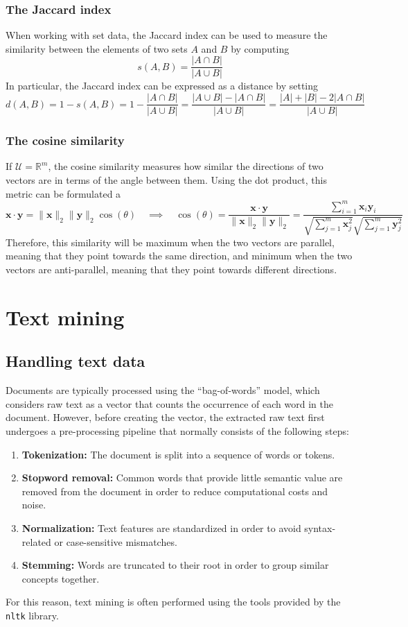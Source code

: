 \documentclass{report}
\begin{document}
\subsection{The Jaccard index}
When working with set data, the Jaccard index can be used to measure the similarity between the elements of two sets $\displaystyle A$ and $\displaystyle B$ by computing
\[s(A, B) = \frac{|A \cap B|}{|A \cup B|}\]
In particular, the Jaccard index can be expressed as a distance by setting
\[d(A, B) = 1 - s(A, B) = 1 - \frac{|A \cap B|}{|A \cup B|} = \frac{|A \cup B| - |A \cap B|}{|A \cup B|} = \frac{|A| + |B| - 2|A \cap B|}{|A \cup B|}\]
\subsection{The cosine similarity}
If $\displaystyle \mathcal{U} = \mathbb{R}^m$, the cosine similarity measures how similar the directions of two vectors are in terms of the angle between them. \newline
Using the dot product, this metric can be formulated a
\[\mathbf{x} \cdot \mathbf{y} = \lVert \mathbf{x} \rVert_2 \lVert \mathbf{y} \rVert_2 \cos(\theta) 
\quad \implies \quad 
\cos(\theta) = \frac{\mathbf{x} \cdot \mathbf{y}}{\lVert \mathbf{x} \rVert_2 \lVert \mathbf{y} \rVert_2} = \frac{\sum_{i = 1}^m \mathbf{x}_i\mathbf{y}_i}{\sqrt{\sum_{j = 1}^m \mathbf{x}_j^2}\sqrt{\sum_{j = 1}^m \mathbf{y}_j^2}}\]
Therefore, this similarity will be maximum when the two vectors are parallel, meaning that they point towards the same direction, and minimum when the two vectors are anti-parallel, meaning that they point towards different directions.

\chapter{Text mining}
\section{Handling text data}
Documents are typically processed using the ``bag-of-words'' model, which considers raw text as a vector that counts the occurrence of each word in the document. \newline
However, before creating the vector, the extracted raw text first undergoes a pre-processing pipeline that normally consists of the following steps:
\begin{enumerate}
    \item \textbf{Tokenization: }The document is split into a sequence of words or tokens.
    \item \textbf{Stopword removal: }Common words that provide little semantic value are removed from the document in order to reduce computational costs and noise.
    \item \textbf{Normalization: }Text features are standardized in order to avoid syntax-related or case-sensitive mismatches.
    \item \textbf{Stemming: }Words are truncated to their root in order to group similar concepts together.
\end{enumerate}
For this reason, text mining is often performed using the tools provided by the \texttt{nltk} library.
\end{document}
